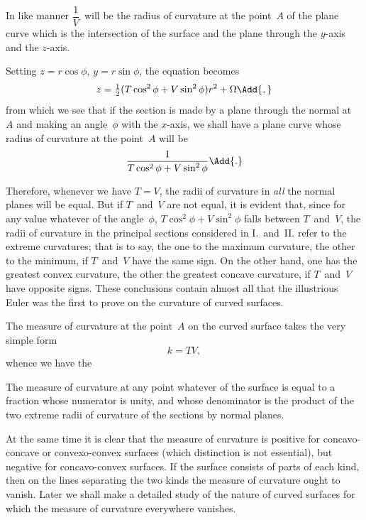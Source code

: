  In like manner $\dfrac{1}{V}$~will be the radius of curvature at the point~$A$ of the plane
curve which is the intersection of the surface and the plane through the $y$-axis and
the $z$-axis.

 Setting $z = r \cos\phi$, $y = r \sin \phi$, the equation becomes
\[
z = \tfrac{1}{2}(T\cos^{2}\phi + V\sin^{2}\phi) r^{2} + \Omega\Add{,}
\]
from which we see that if the section is made by a plane through the normal at~$A$
and making an angle~$\phi$ with the $x$-axis, we shall have a plane curve whose radius of
curvature at the point~$A$ will be
\[
\frac{1}{T\cos^{2}\phi + V\sin^{2}\phi}\Add{.}
\]

 Therefore, whenever we have $T = V$, the radii of curvature in \emph{all} the normal
planes will be equal. But if $T$~and~$V$ are not equal, it is evident that, since for any
value whatever of the angle~$\phi$, $T\cos^{2}\phi + V\sin^{2}\phi$ falls between $T$~and~$V$, the radii of
curvature in the principal sections considered in I.~and~II. refer to the extreme curvatures;
that is to say, the one to the maximum curvature, the other to the minimum,
if $T$~and~$V$ have the same sign. On the other hand, one has the greatest convex
curvature, the other the greatest concave curvature, if $T$~and~$V$ have opposite signs.
These conclusions contain almost all that the illustrious Euler was the first to prove
on the curvature of curved surfaces.

 The measure of curvature at the point~$A$ on the curved surface takes the
very simple form
\[
k = TV,
\]
whence we have the

\begin{Theorem}
The measure of curvature at any point whatever of the surface is equal to a
fraction whose numerator is unity, and whose denominator is the product of the two extreme
radii of curvature of the sections by normal planes.\
\end{Theorem}

At the same time it is clear that the measure of curvature is positive for concavo-concave
or convexo-convex surfaces (which distinction is not essential), but negative
for concavo-convex surfaces. If the surface consists of parts of each kind, then
on the lines separating the two kinds the measure of curvature ought to vanish. Later
we shall make a detailed study of the nature of curved surfaces for which the measure
of curvature everywhere vanishes.



